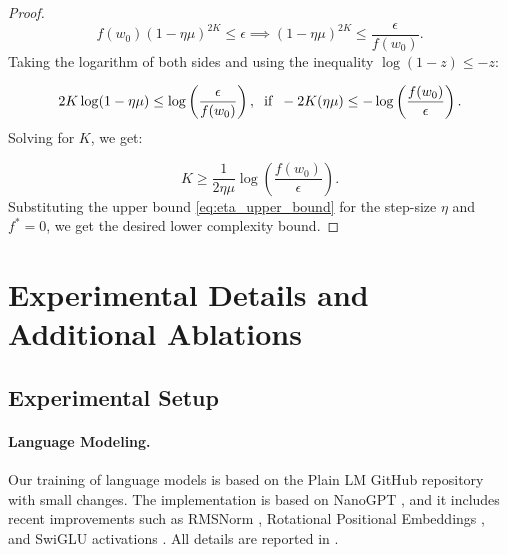 \documentclass[a4paper,11pt]{article}
\newcommand{\1}{\mathbbm{1}}
\theoremstyle{plain}
\begin{document}
\begin{proof}
$$
 f(w_0) (1-\eta\mu)^{2K} \leq \epsilon \implies (1-\eta\mu)^{2K} \leq \frac{\epsilon}{f(w_0)}. 
$$
Taking the logarithm of both sides and using the inequality $\log(1-z) \leq -z$:

$$
 2K \log(1 - \eta\mu) \leq \log\left(\frac{\epsilon}{f(w_0)}\right), \hspace{2mm} \text{if} \hspace{2mm} -2K(\eta\mu) \leq -\log\left(\frac{f(w_0)}{\epsilon}\right). 
$$
Solving for $K$, we get:

$$
 K \geq \frac{1}{2\eta\mu} \log\left(\frac{f(w_0)}{\epsilon}\right). 
$$
Substituting the upper bound \eqref{eq:eta_upper_bound} for the step-size $\eta$ and $f^*=0$, we get the desired lower complexity bound.



    
\end{proof}




\section{Experimental Details and Additional Ablations}\label{sec:additional_exp}


\subsection{Experimental Setup}


\paragraph{Language Modeling.} Our training of language models is based on the Plain LM GitHub repository \citep{ajroldi2024plainlm} with small changes. The implementation is based on NanoGPT \citep{karpathy2022nanogpt}, and it includes recent improvements such as RMSNorm \citep{zhang2019root}, Rotational Positional Embeddings \citep{su2024roformer}, and SwiGLU activations \citep{shazeer2020glu}. All details are reported in .
\end{document}
